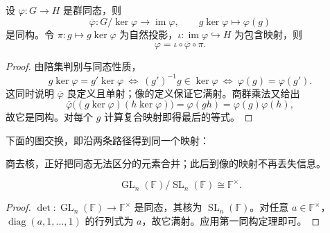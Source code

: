 \documentclass[lang=cn,a4paper,fontset=none,zihao=false,10pt,openany,twoside]{beautybook}
\numberwithin{algorithm}{chapter}
\begin{document}
\begin{theorem}[第一同构定理]\label{thm:first-isomorphism}
设 $\varphi:G\to H$ 是群同态，则
\[
 \overline\varphi:G/\ker\varphi\longrightarrow\operatorname{im}\varphi,
 \qquad g\ker\varphi\longmapsto\varphi(g)
\]
是同构。令 $\pi:g\mapsto g\ker\varphi$ 为自然投影，$\iota:\operatorname{im}\varphi\hookrightarrow H$ 为包含映射，则
\[
 \varphi=\iota\circ\overline\varphi\circ\pi.
\]
\end{theorem}
\begin{proof}
由陪集判别与同态性质，
\[
 g\ker\varphi=g'\ker\varphi
 \ \Longleftrightarrow\ (g')^{-1}g\in\ker\varphi
 \ \Longleftrightarrow\ \varphi(g)=\varphi(g').
\]
这同时说明 $\overline\varphi$ 良定义且单射；像的定义保证它满射。商群乘法又给出
\[
 \overline\varphi\bigl((g\ker\varphi)(h\ker\varphi)\bigr)
 =\varphi(gh)=\varphi(g)\varphi(h),
\]
故它是同构。对每个 $g$ 计算复合映射即得最后的等式。
\end{proof}
下面的图交换，即沿两条路径得到同一个映射：
\begin{center}
\end{center}
商去核，正好把同态无法区分的元素合并；此后到像的映射不再丢失信息。

\begin{example}[行列式给出的商群]
\[
 \operatorname{GL}_n(\mathbb F)/\operatorname{SL}_n(\mathbb F)
 \cong\mathbb F^\times.
\]
\end{example}
\begin{proof}
$\det:\operatorname{GL}_n(\mathbb F)\to\mathbb F^\times$ 是同态，其核为 $\operatorname{SL}_n(\mathbb F)$。对任意 $a\in\mathbb F^\times$，$\operatorname{diag}(a,1,\ldots,1)$ 的行列式为 $a$，故它满射。应用第一同构定理即可。
\end{proof}
\end{document}
